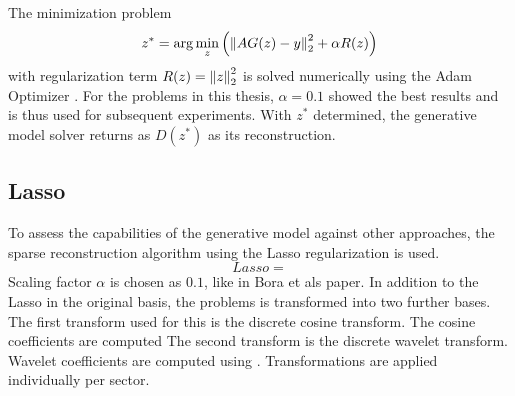 The minimization problem
\begin{equation}
    z^* = \arg\min_{z}{\left( \left\lVert A G(z) - y\right\rVert_2^2 + \alpha R(z) \right)}
\end{equation}
with regularization term $R(z) = \left\lVert z\right\rVert_2^2$ is solved numerically using the Adam Optimizer \parencite{Adam}.
For the problems in this thesis, $\alpha = 0.1$ showed the best results and is thus used for subsequent experiments.
With $z^*$ determined, the generative model solver returns as $D(z^*)$ as its reconstruction.

\subsection{Lasso}
To assess the capabilities of the generative model against other approaches, the sparse reconstruction algorithm using the Lasso regularization \parencite{Lasso} is used.
\begin{equation}
    Lasso = 
\end{equation}
Scaling factor $\alpha$ is chosen as $0.1$, like in Bora et als paper.
In addition to the Lasso in the original basis, the problems is transformed into two further bases.
The first transform used for this is the discrete cosine transform.
The cosine coefficients are computed
The second transform is the discrete wavelet transform.
Wavelet coefficients are computed using \parencite{PyWavelets}.
Transformations are applied individually per sector.
